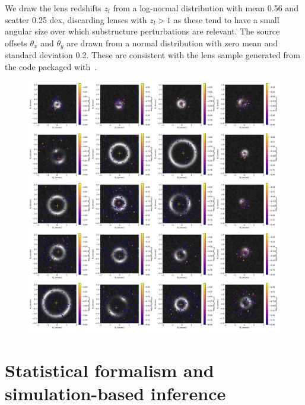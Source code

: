 \documentclass[twocolumn]{aastex62}
\begin{document}
We draw the lens redshifts $z_l$ from a log-normal distribution with mean 0.56 and scatter 0.25 dex, discarding lenses with $z_l > 1$ as these tend to have a small angular size over which substructure perturbations are relevant. The source offsets $\theta_x$ and $\theta_y$ are drawn from a normal distribution with zero mean and standard deviation 0.2. These are consistent with the lens sample generated from the  code packaged with~\citet{2015ApJ...811...20C}.

\begin{figure}[tbp]
\centering
\includegraphics[width=1.\textwidth]{figures/simulations}
\caption{}
\label{fig:simulations}
\end{figure}


\section{Statistical formalism and simulation-based inference}
\label{sec:lfi-formalism}
\end{document}
